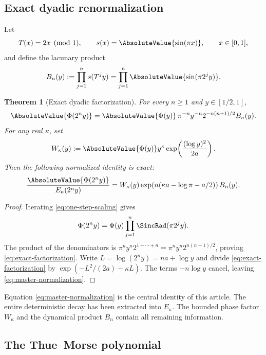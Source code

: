 \documentclass[11pt,oneside]{article}
\newtheorem{theorem}{Theorem}[section]
\theoremstyle{definition}
\theoremstyle{remark}
\newcommand{\Phiup}{\Phi}
\begin{document}
\subsection{Exact dyadic renormalization}
\label{subsec:dyadic-renormalization}

Let
\[
 T(x)=2x\pmod1,
 \qquad
 s(x)=\AbsoluteValue{\sin(\pi x)},
 \qquad x\in[0,1],
\]
and define the lacunary product
\begin{equation}
 B_n(y):=\prod_{j=1}^{n}s(T^j y)
 =\prod_{j=1}^{n}\AbsoluteValue{\sin(\pi2^j y)}.
 \label{eq:Bny}
\end{equation}

\begin{theorem}[Exact dyadic factorization]
\label{thm:exact-dyadic-factorization}
For every $n\ge1$ and $y\in[1/2,1]$,
\begin{equation}
 \AbsoluteValue{\Phiup(2^n y)}
 =\AbsoluteValue{\Phiup(y)}\,\pi^{-n}y^{-n}2^{-n(n+1)/2}B_n(y).
 \label{eq:exact-factorization}
\end{equation}
For any real $\kappa$, set
\begin{equation}
 W_\kappa(y)
 :=\AbsoluteValue{\Phiup(y)}y^\kappa
   \exp\!\left(\frac{(\log y)^2}{2a}\right).
 \label{eq:W-kappa}
\end{equation}
Then the following normalized identity is exact:
\begin{equation}
 \frac{\AbsoluteValue{\Phiup(2^n y)}}{E_\kappa(2^n y)}
 =W_\kappa(y)
  \exp\!\left(n(\kappa a-\log\pi-a/2)\right)B_n(y).
 \label{eq:master-normalization}
\end{equation}
\end{theorem}

\begin{proof}
Iterating \eqref{eq:one-step-scaling} gives
\[
 \Phiup(2^n y)=\Phiup(y)\prod_{j=1}^{n}\SincRad(\pi2^j y).
\]
The product of the denominators is
$\pi^ny^n2^{1+\cdots+n}=\pi^ny^n2^{n(n+1)/2}$, proving
\eqref{eq:exact-factorization}.  Write $L=\log(2^ny)=na+\log y$ and divide
\eqref{eq:exact-factorization} by
$\exp(-L^2/(2a)-\kappa L)$.  The terms $-n\log y$ cancel, leaving
\eqref{eq:master-normalization}.
\end{proof}

Equation \eqref{eq:master-normalization} is the central identity of this article.  The
entire deterministic decay has been extracted into $E_\kappa$.  The bounded phase factor
$W_\kappa$ and the dynamical product $B_n$ contain all remaining information.

\subsection{The Thue--Morse polynomial}
\end{document}
